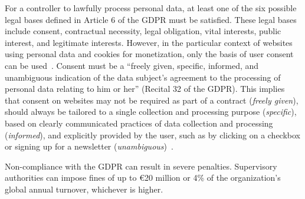 For a controller to lawfully process personal data, at least one of the six possible legal bases defined in Article 6 of the GDPR must be satisfied.
These legal bases include consent, contractual necessity, legal obligation, vital interests, public interest, and legitimate interests.
However, in the particular context of websites using personal data and cookies for monetization, only the basis of user consent can be used~\cite{kubicek2024phd}.
Consent must be a \enquote{freely given, specific, informed, and unambiguous indication of the data subject's agreement to the processing of personal data relating to him or her} (Recital 32 of the GDPR).
This implies that consent on websites may not be required as part of a contract (\emph{freely given}), should always be tailored to a single collection and processing purpose (\emph{specific}), based on clearly communicated practices of data collection and processing (\emph{informed}), and explicitly provided by the user, such as by clicking on a checkbox or signing up for a newsletter (\emph{unambiguous})~\cite{kubicek2024phd}.

Non-compliance with the GDPR can result in severe penalties. 
Supervisory authorities can impose fines of up to €20 million or 4\% of the organization's global annual turnover, whichever is higher. 
